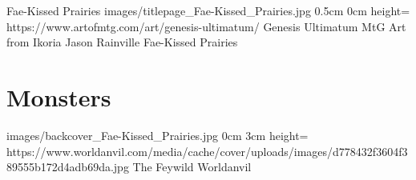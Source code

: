 \documentclass[letterpaper,openany,twoside,twocolumn]{book}
\begin{document}
	\regionTitlePage
		{Fae-Kissed Prairies}
		{images/titlepage_Fae-Kissed_Prairies.jpg}
		{0.5cm}
		{0cm}
		{height=\paperheight}
		{https://www.artofmtg.com/art/genesis-ultimatum/}
		{Genesis Ultimatum MtG Art from Ikoria}
		{Jason Rainville}
		{Fae-Kissed Prairies}
	
	\tableofcontents
	
	\mainmatter
	
	\MonsterSheetGeometry
	\part{Monsters}
	
	
	
	\bookLastPage
		{images/backcover_Fae-Kissed_Prairies.jpg}
		{0cm}
		{3cm}
		{height=\paperheight}
		{https://www.worldanvil.com/media/cache/cover/uploads/images/d778432f3604f389555b172d4adb69da.jpg}
		{The Feywild}
		{Worldanvil}
		{}
\end{document}
